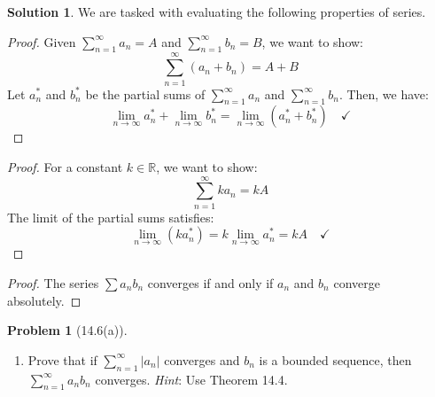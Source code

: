 \documentclass[12pt]{article}
\theoremstyle{definition} %
\newtheorem{solution}{Solution}
\newtheorem{problem}{Problem}
\theoremstyle{plain} %
\begin{document}
   \begin{solution}
      We are tasked with evaluating the following properties of series.
      
      \begin{enumerate}
          \item \begin{proof}
            Given \( \sum_{n=1}^{\infty} a_n = A \) and \( \sum_{n=1}^{\infty} b_n = B \), we want to show:
            \[
            \sum_{n=1}^{\infty} (a_n + b_n) = A + B
            \]
            Let \( a_n^* \) and \( b_n^* \) be the partial sums of \( \sum_{n=1}^{\infty} a_n \) and \( \sum_{n=1}^{\infty} b_n \). Then, we have:
            \[
            \lim_{n \to \infty} a_n^* + \lim_{n \to \infty} b_n^* = \lim_{n \to \infty} (a_n^* + b_n^*) \quad \checkmark
            \]
            
            
          \end{proof}
          \item \begin{proof}
            \item For a constant \( k \in \mathbb{R} \), we want to show:
            \[
            \sum_{n=1}^{\infty} k a_n = kA
            \]
            The limit of the partial sums satisfies:
            \[
            \lim_{n \to \infty} (k a_n^*) = k \lim_{n \to \infty} a_n^* = kA \quad \checkmark
            \]  
          \end{proof}
          \item \begin{proof}
            The series \( \sum a_nb_n \) converges if and only if \(a_{n}\) and \(b_{n}\) converge absolutely. 
          \end{proof}
      \end{enumerate}
      
      \end{solution}
\begin{problem}[14.6(a)]
    \begin{enumerate}
        \item Prove that if \(\sum_{n=1}^{\infty} \left\vert a_{n}  \right\vert \) converges and \(b_{n} \) is a bounded sequence, then \(\sum_{n=1}^{\infty} a_{n}b_{n} \) converges. \emph{Hint}: Use Theorem 14.4. 
    \end{enumerate}
    
\end{problem}
\end{document}

